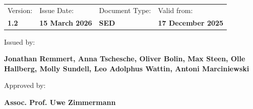 \documentclass[
  a4paper,
  11pt,
  openany,
  parskip,
  toc=totoc,
  listof=totoc,
  bibliography=totoc
]{scrreprt}
\begin{document}
\begin{titlepage}
\enlargethispage{3cm}

\begin{tabular}{llll}
  Version:        & Issue Date:               & Document Type: & Valid from: \\
  \textbf{1.2}      & \textbf{15 March 2026}    & \textbf{SED}  & \textbf{17 December 2025}
\end{tabular}

Issued by:
\vspace{0.3cm}

{\large \textbf{Jonathan Remmert,
Anna Tschesche,
Oliver Bolin,
Max Steen,
Olle Hallberg,
Molly Sundell,
Leo Adolphus Wattin,
Antoni Marciniewski}} %

Approved by:
\vspace{0.3cm}

{\large \textbf{Assoc. Prof. Uwe Zimmermann}} 



\end{titlepage}

\end{document}
